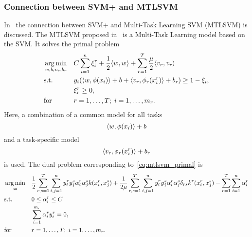\subsubsection*{Connection between SVM\small{+} and MTLSVM}
In~\cite{LiangC08} the connection between SVM\small{+} and Multi-Task Learning SVM (MTLSVM) is discussed. 
The MTLSVM proposed in~\cite{LiangC08} is a Multi-Task Learning model based on the SVM. It solves the primal problem
\begin{equation}
    \label{eq:mtlsvm_primal}
    \begin{aligned}
        & \argmin_{w, b, v_r, b_r}
        & & C \sum_{i=1}^\nsamples \xi_i^r + \frac{1}{2} \dotp{w}{w} + \sum_{r=1}^\ntasks \frac{\mu}{2} \dotp{v_r}{v_r} \\
        & \text{s.t.}
        & & y_{i} ( \dotp{w}{\phi(x_{i})} + b + \dotp{v_r}{\phi_r(x_{i}^r)} + b_r) \geq 1 - \xi_i ,\\
        & & &\xi_i^r \geq 0, \\
        & \text{for } & & r=1, \ldots, \ntasks; \; i=1, \ldots, \npertask_r.
    \end{aligned}
\end{equation}
Here, a combination of a common model for all tasks
$$ \langle w, \phi(x_{i}) \rangle + b $$
and a task-specific model
$$ \langle v_r, \phi_r(x_{i}^r) \rangle + b_r $$
is used.
The dual problem corresponding to~\eqref{eq:mtlsvm_primal} is
\begin{equation}\label{eq:mtlsvm_dual}
    \begin{aligned}
        & \argmin_{\myvec{\alpha}} 
        & & \frac{1}{2} \sum_{r, s=1}^\ntasks \sum_{i, j=1}^\nsamples y_i^r y_j^s \alpha_i^r \alpha_j^s k(x_i^r, x_j^s) + \frac{1}{2 \mu} \sum_{r, s=1}^\ntasks  \sum_{i, j=1}^\nsamples y_i^r y_j^s \alpha_i^r \alpha_j^s \delta_{rs} k^r(x^r_i, x^s_j)  - \sum_{r=1}^\ntasks \sum_{i=1}^\nsamples \alpha_i^r \\
        & \text{s.t.}
        & & 0 \leq \alpha_i^r \leq C \\
        & & & \sum_{i=1}^{\npertask_r}{\alpha_i^r y_i^r} = 0, \\
        & \text{for } & & r=1, \ldots, \ntasks; \; i=1, \ldots, \npertask_r.
        \end{aligned}
\end{equation}





